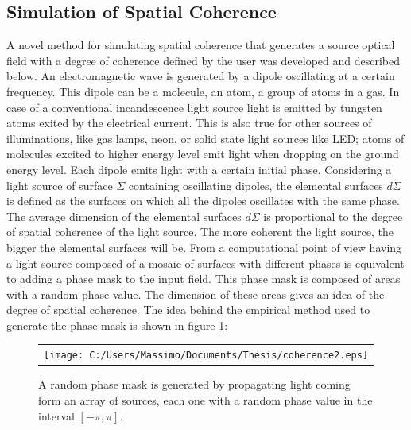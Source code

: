 \subsection{Simulation of Spatial Coherence}
\label{sec:spatial}
A novel method for simulating spatial coherence that generates a source optical field with a degree of coherence defined by the user was developed and described below. An electromagnetic wave is generated by a dipole oscillating at a certain frequency. This dipole can be a molecule, an atom, a group of atoms in a gas. In case of a conventional incandescence light source light is emitted by tungsten atoms exited by the electrical current. This is also true for other sources of illuminations, like gas lamps, neon, or solid state light sources like LED; atoms of molecules excited to higher energy level emit light when dropping on the ground energy level. Each dipole emits light with a certain initial phase. Considering a light source of surface $\Sigma$ containing oscillating dipoles, the elemental surfaces $d\Sigma$ is defined as the surfaces on which all the dipoles oscillates with the same phase. The average dimension of the elemental surfaces $d\Sigma$ is proportional to the degree of spatial coherence of the light source. The more coherent the light source, the bigger the elemental surfaces will be. 
From a computational point of view having a light source composed of a mosaic of surfaces with different phases is equivalent to adding a phase mask to the input field. This phase mask is composed of areas with a random phase value. The dimension of these areas gives an idea of the degree of spatial coherence. The idea behind the empirical method used to generate the phase mask is shown in figure \ref{fig:phasemask1}: 
\begin{figure}[H]
	\begin{center}
		\begin{tabular}{c}
			\texttt{[image: C:/Users/Massimo/Documents/Thesis/coherence2.eps]}
		\end{tabular}
	\end{center}
	\caption{ \label{fig:phasemask1} 
		A random phase mask is generated by propagating light coming form an array of sources, each one with a random phase value in the interval $[-\pi,\pi]$. }
\end{figure} 
